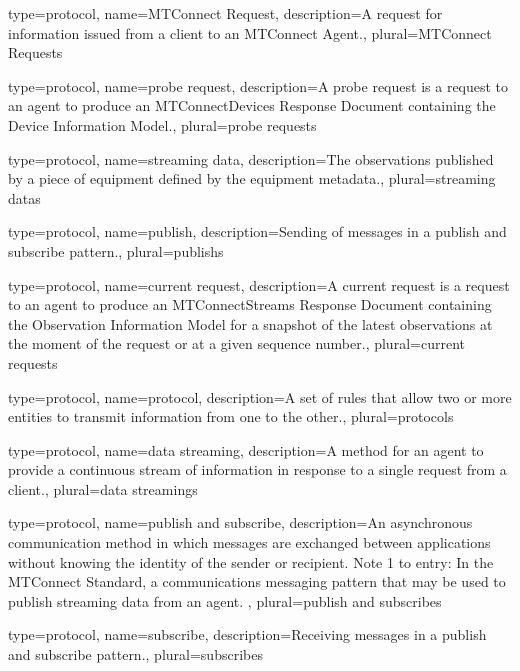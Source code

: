 {
	type={protocol},
    name={MTConnect Request},
	description={A \gls{request} for information issued from a \gls{client} to an \gls{MTConnect Agent}.},
	plural={MTConnect Requests}
}

{
	type={protocol},
    name={probe request},
	description={A \gls{probe request} is a \gls{request} to an \gls{agent} to produce an \gls{MTConnectDevices Response Document} containing the \gls{Device Information Model}.},
	plural={probe requests}
}

{
	type={protocol},
    name={streaming data},
	description={The \glspl{observation} published by a piece of equipment defined by the \gls{equipment metadata}.},
	plural={streaming datas}
}

{
	type={protocol},
    name={publish},
	description={Sending of messages in a \gls{publish and subscribe} pattern.},
	plural={publishs}
}

{
	type={protocol},
    name={current request},
	description={A \gls{current request} is a \gls{request} to an \gls{agent} to produce an \gls{MTConnectStreams Response Document} containing the \gls{Observation Information Model} for a snapshot of the latest \glspl{observation} at the moment of the \gls{request} or at a given \gls{sequence number}.},
	plural={current requests}
}

{
	type={protocol},
    name={protocol},
	description={A set of rules that allow two or more entities to transmit information from one to the other.},
	plural={protocols}
}

{
	type={protocol},
    name={data streaming},
	description={A method for an \gls{agent} to provide a continuous stream of information in response to a single \gls{request} from a \gls{client}.},
	plural={data streamings}
}

{
	type={protocol},
    name={publish and subscribe},
	description={An asynchronous communication method in which messages are exchanged between applications without knowing the identity of the sender or recipient.
Note 1 to entry: In the MTConnect Standard, a communications messaging pattern that may be used to publish \gls{streaming data} from an \gls{agent}. },
	plural={publish and subscribes}
}

{
	type={protocol},
    name={subscribe},
	description={Receiving messages in a \gls{publish and subscribe} pattern.},
	plural={subscribes}
}


